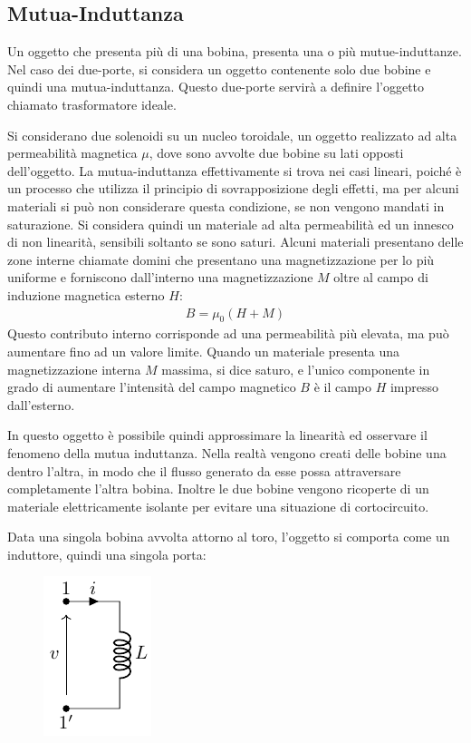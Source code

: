 \documentclass{article}
\numberwithin{equation}{subsection}
\begin{document}
\subsection{Mutua-Induttanza}

Un oggetto che presenta più di una bobina, presenta una o più mutue-induttanze. Nel caso dei due-porte, si considera un oggetto contenente solo due bobine e quindi una 
mutua-induttanza. Questo due-porte servirà a definire l'oggetto chiamato trasformatore ideale. 



Si considerano due solenoidi su un nucleo toroidale, un oggetto realizzato ad alta permeabilità magnetica $\mu$, dove sono avvolte due bobine su lati opposti dell'oggetto. 
La mutua-induttanza effettivamente si trova nei casi lineari, 
poiché è un processo che utilizza il principio di sovrapposizione degli effetti, ma per alcuni materiali si può non considerare questa condizione, se non vengono mandati 
in saturazione. Si considera quindi un materiale ad alta permeabilità ed un innesco di non linearità, sensibili soltanto se sono saturi. 
Alcuni materiali presentano delle zone interne chiamate domini che presentano una magnetizzazione per lo più uniforme e forniscono dall'interno una magnetizzazione $M$ oltre 
al campo di induzione magnetica esterno $H$:
\begin{gather*}
    B=\mu_0(H+M)
\end{gather*}
Questo contributo interno corrisponde ad una permeabilità più elevata, ma può aumentare fino ad un valore limite. Quando un materiale presenta una magnetizzazione interna 
$M$ massima, si dice saturo, e l'unico componente in grado di aumentare l'intensità del campo magnetico $B$ è il campo $H$ impresso dall'esterno.  

In questo oggetto è possibile quindi approssimare la linearità ed osservare il fenomeno della mutua induttanza. Nella realtà vengono creati delle bobine una dentro l'altra, 
in modo che il flusso generato da esse possa attraversare completamente l'altra bobina. Inoltre le due bobine vengono ricoperte di un materiale elettricamente isolante per 
evitare una situazione di cortocircuito. 

Data una singola bobina avvolta attorno al toro, l'oggetto si comporta come un induttore, quindi una singola porta:
\begin{figure}[H]%
    \centering
    \includegraphics{bobina-singola.pdf}%
    \label{fig:bobina-singola}
\end{figure}
\end{document}
